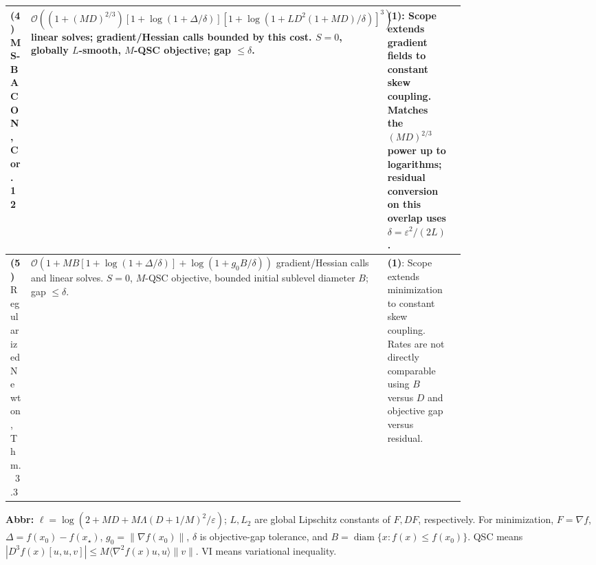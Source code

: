 \begin{table}[tp]
\begin{threeparttable}
\begin{tabularx}{\linewidth}{@{}>{\raggedright\arraybackslash}p{0.20\linewidth}>{\raggedright\arraybackslash}p{0.32\linewidth}>{\raggedright\arraybackslash}p{0.25\linewidth}>{\raggedright\arraybackslash}X@{}}
\midrule
\textbf{(4)} MS-BACON \citep{hssCarmon2020v1}, Cor.~12 & $\mathcal{O}((1+(MD)^{2/3})[1+\log(1+\Delta/\delta)] [1+\log(1+LD^2(1+MD)/\delta)]^3)$ linear solves; gradient/Hessian calls bounded by this cost. $S=0$, globally $L$-smooth, $M$-QSC objective; gap $\le\delta$. & \textbf{(1)}: Scope extends gradient fields to constant skew coupling. Matches the $(MD)^{2/3}$ power up to logarithms; residual conversion on this overlap uses $\delta=\varepsilon^2/(2L)$. & \\
\midrule
\textbf{(5)} Regularized Newton \citep{hssDoikov2023v1}, Thm.~3.3 & $\mathcal{O}(1+MB[1+\log(1+\Delta/\delta)]+\log(1+g_0B/\delta))$ gradient/Hessian calls and linear solves. $S=0$, $M$-QSC objective, bounded initial sublevel diameter $B$; gap $\le\delta$. & \textbf{(1)}: Scope extends minimization to constant skew coupling. Rates are not directly comparable using $B$ versus $D$ and objective gap versus residual. & \\
\bottomrule
\end{tabularx}
\begin{tablenotes}[flushleft]\footnotesize
\item[] \textbf{Abbr:} $\ell=\log(2+MD+M\Lambda(D+1/M)^2/\varepsilon)$; $L,L_2$ are global Lipschitz constants of $F,DF$, respectively. For minimization, $F=\nabla f$, $\Delta=f(x_0)-f(x_\star)$, $g_0=\|\nabla f(x_0)\|$, $\delta$ is objective-gap tolerance, and $B=\operatorname{diam}\{x:f(x)\le f(x_0)\}$. QSC means $|D^3f(x)[u,u,v]|\le M\langle\nabla^2f(x)u,u\rangle\|v\|$. VI means variational inequality.
\end{tablenotes}
\end{threeparttable}
\end{table}
\clearpage
